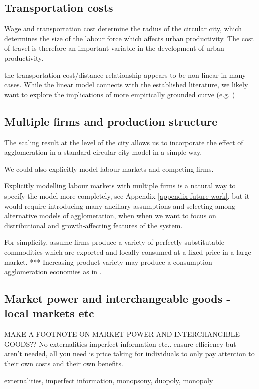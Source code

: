 \subsection{Transportation costs}
Wage and transportation cost determine the radius of the circular city, which determines the size of the labour force which affects urban productivity. The cost of travel is therefore an important variable in the development of urban productivity. 

the transportation cost/distance relationship appears to be non-linear in many cases. While the linear model connects with the established literature, we likely want to explore the implications of more empirically grounded curve (e.g. \cite{Alain-Bertaud-2015})

\subsection{Multiple firms and production structure}
The scaling result at the level of the city allows us to incorporate the effect of agglomeration in a standard \gls{circular city} model in a simple way. 

We could also explicitly model labour markets and competing firms. 

Explicitly modelling labour markets with multiple firms is a natural way to specify the model more completely, see Appendix \ref{appendix-future-work},  but it would require introducing many ancillary assumptions and selecting among alternative models of agglomeration, when when we want to focus on distributional and growth-affecting features of the system.

For simplicity, assume firms produce a variety of perfectly substitutable commodities which are exported and locally consumed at a fixed price in a large market. 
***  Increasing product variety may produce a consumption agglomeration economies as in \cite{fujitaSpatialEconomyCities1999}.

\subsection{Market power and interchangeable goods - local markets etc}
MAKE A FOOTNOTE ON MARKET POWER AND INTERCHANGIBLE GOODS??
No externalities imperfect information etc.. ensure efficiency but aren't needed, all you need is price taking for individuals to only pay attention to their own costs and their own benefits. 

\gls{externalities}, \gls{imperfect information}, \gls{monopsony}, \gls{duopoly}, \gls{monopoly}

